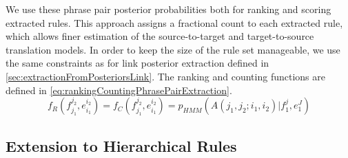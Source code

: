 %
We use these phrase pair posterior probabilities both for ranking and scoring
extracted rules. This approach assigns a fractional count to each extracted
rule, which allows finer estimation of the source-to-target and target-to-source
translation models. In order to keep the size of the rule set manageable, we use
the same constraints as for link posterior extraction defined in
\autoref{sec:extractionFromPosteriorsLink}. The ranking and counting functions
are defined in \autoref{eq:rankingCountingPhrasePairExtraction}.
%
\begin{equation}
  f_R(f_{j_1}^{j_2},e_{i_1}^{i_2}) = f_C(f_{j_1}^{j_2},e_{i_1}^{i_2}) = p_{HMM}(A(j_1, j_2; i_1, i_2) | f_1^j, e_1^J)
  \label{eq:rankingCountingPhrasePairExtraction}
\end{equation}

\subsection{Extension to Hierarchical Rules}
\label{sec:extractionFromPosteriorsExtractionDisjoint}

